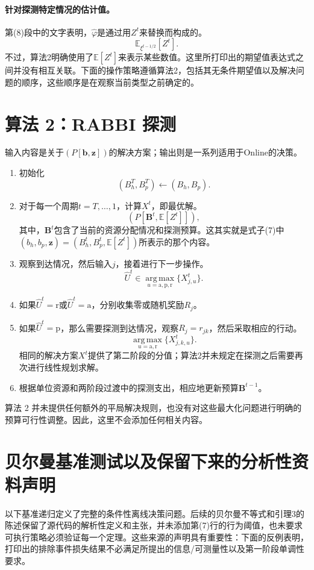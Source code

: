\documentclass{article}
\begin{document}
\paragraph{针对探测特定情况的估计值。}
第(8)段中的文字表明，$\hat\varphi$是通过用$Z^t$来替换而构成的。
\[
\mathbb E_{\xi^{t-1/2}}[Z^t].
\]
不过，算法2明确使用了$\mathbb E[Z^t]$来表示某些数值。这里所打印出的期望值表达式之间并没有相互关联。下面的操作策略遵循算法2，包括其无条件期望值以及解决问题的顺序，这些顺序是在观察当前类型之前确定的。

\section*{算法 2：RABBI 探测}
输入内容是关于$(P[\mathbf b,\mathbf z])$的解决方案；输出则是一系列适用于Online的决策。
\begin{enumerate}
\item 初始化
\[
(B_h^T,B_p^T)\leftarrow(B_h,B_p).
\]
\item 对于每一个周期$t=T,\ldots,1$，计算$X^t$，即最优解。
\[
(P[\mathbf B^t,\mathbb E[Z^t]]),
\]
其中，$\mathbf B^t$包含了当前的资源分配情况和探测预算。这其实就是式子(7)中$(b_h,b_p,\mathbf z)=(B_h^t,B_p^t,\mathbb E[Z^t])$所表示的那个内容。
\item 观察到达情况，然后输入$j$，接着进行下一步操作。
\[
\hat U^t\in\operatorname*{arg\,max}_{u=\mathrm a,\mathrm p,\mathrm r}
\{X^t_{j,u}\}.
\]
\item 如果$\hat U^t=\mathrm r$或$\hat U^t=\mathrm a$，分别收集零或随机奖励$R_j$。
\item 如果$\hat U^t=\mathrm p$，那么需要探测到达情况，观察$R_j=r_{jk}$，然后采取相应的行动。
\[
\operatorname*{arg\,max}_{u=\mathrm a,\mathrm r}\{X^t_{j,k,u}\}.
\]
相同的解决方案$X^t$提供了第二阶段的分值；算法2并未规定在探测之后需要再次进行线性规划求解。
\item 根据单位资源和两阶段过渡中的探测支出，相应地更新预算$\mathbf B^{t-1}$。
\end{enumerate}
算法 2 并未提供任何额外的平局解决规则，也没有对这些最大化问题进行明确的预算可行性调整。因此，这里不会添加任何相关内容。

\section*{贝尔曼基准测试以及保留下来的分析性资料声明}
以下基准递归定义了完整的条件性离线决策问题。后续的贝尔曼不等式和引理3的陈述保留了源代码的解析性定义和主张，并未添加第(7)行的行为阈值，也未要求可执行策略必须验证每一个定理。这些来源的声明具有重要性：下面的反例表明，打印出的排除事件损失结果不必满足所提出的信息/可测量性以及第一阶段单调性要求。
\end{document}
